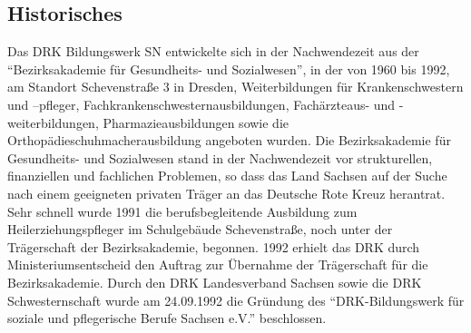 \subsection{Historisches}
\label{sec:Historisches}

Das DRK Bildungswerk SN entwickelte sich in der Nachwendezeit aus der "`Bezirksakademie für Gesundheits- und Sozialwesen"', in der von 1960 bis 1992, am Standort Schevenstraße 3 in Dresden, Weiterbildungen für Krankenschwestern und –pfleger,  Fachkrankenschwesternausbildungen, Fachärzteaus- und -weiterbildungen, Pharmazieausbildungen sowie die Orthopädieschuhmacherausbildung angeboten wurden. Die Bezirksakademie für Gesundheits- und Sozialwesen stand in der Nachwendezeit vor strukturellen, finanziellen und fachlichen Problemen, so dass das Land Sachsen auf der Suche nach einem geeigneten privaten Träger an das Deutsche Rote Kreuz herantrat. Sehr schnell wurde 1991 die berufsbegleitende Ausbildung zum Heilerziehungspfleger im Schulgebäude Schevenstraße, noch unter der Trägerschaft der Bezirksakademie, begonnen. 1992 erhielt das DRK durch Ministeriumsentscheid den Auftrag zur Übernahme der Trägerschaft für die Bezirksakademie. Durch den DRK Landesverband Sachsen sowie die DRK Schwesternschaft  wurde am 24.09.1992 die Gründung des "`DRK-Bildungswerk für soziale und pflegerische Berufe Sachsen e.V."' beschlossen.  

